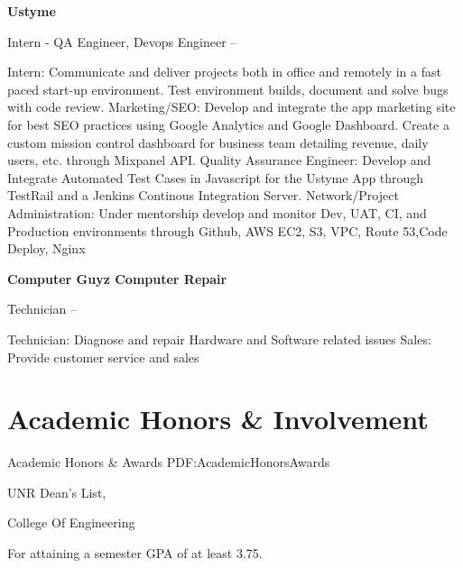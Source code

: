 \documentclass[a4paper,10pt,oneside]{article}
\begin{document}
\begin{body}
{\textbf{Ustyme}}
\par
Intern - QA Engineer, Devops Engineer 
\hfill
{} --
\begin{detail}
\BulletItem
Intern: Communicate and deliver projects both in office and remotely in a fast \newline paced start-up environment. Test environment builds, document and solve bugs \newline with code review.
\BulletItem
Marketing/SEO: 
Develop and integrate the app marketing site for best SEO practices \newline using Google Analytics and Google Dashboard.
Create a custom mission control \newline dashboard for business team detailing revenue, daily users, etc. through Mixpanel API.
\BulletItem
Quality Assurance Engineer:
Develop and Integrate Automated Test Cases in Javascript \newline for the Ustyme App through TestRail and a Jenkins Continous Integration Server. 
\BulletItem
Network/Project Administration:
Under mentorship develop and monitor Dev, \newline UAT, CI, and Production environments through Github, AWS EC2, S3, VPC, Route 53,\newline Code Deploy, Nginx \newline
\end{detail}

{\textbf{Computer Guyz Computer Repair}}
\par
Technician
\hfill
{} --
\begin{detail}
\BulletItem
Technician: Diagnose and repair Hardware and Software related issues 
\BulletItem
Sales: Provide customer service and sales
\end{detail}



\section
{Academic Honors\newline
\& Involvement}
{Academic Honors \& Awards}
{PDF:AcademicHonorsAwards}

UNR Dean's List,
\par
College Of Engineering
\begin{detail}
For attaining a semester GPA of at least 3.75.
\end{detail}


\end{body}
\end{document}
